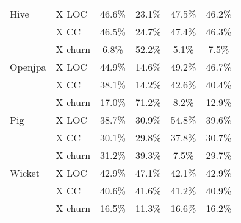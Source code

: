 \begin{table}[!ht]
{\begin{tabular}{l||l | c| c| c| c}
Hive	&	X LOC	&	46.6\%	&	23.1\%	&	47.5\%	&	46.2\%	\\
	&	X CC	&	46.5\%	&	24.7\%	&	47.4\%	&	46.3\%	\\
	&	X churn	&	6.8\%	&	52.2\%	&	5.1\%	&	7.5\%	\\\hline
Openjpa	&	X LOC	&	44.9\%	&	14.6\%	&	49.2\%	&	46.7\%	\\
	&	X CC	&	38.1\%	&	14.2\%	&	42.6\%	&	40.4\%	\\
	&	X churn	&	17.0\%	&	71.2\%	&	8.2\%	&	12.9\%	\\\hline
Pig	&	X LOC	&	38.7\%	&	30.9\%	&	54.8\%	&	39.6\%	\\
	&	X CC	&	30.1\%	&	29.8\%	&	37.8\%	&	30.7\%	\\
	&	X churn	&	31.2\%	&	39.3\%	&	7.5\%	&	29.7\%	\\\hline
Wicket	&	X LOC	&	42.9\%	&	47.1\%	&	42.1\%	&	42.9\%	\\
	&	X CC	&	40.6\%	&	41.6\%	&	41.2\%	&	40.9\%	\\
	&	X churn	&	16.5\%	&	11.3\%	&	16.6\%	&	16.2\%	\\\hline
	        
	        
\end{tabular}
}			
\end{table}		
